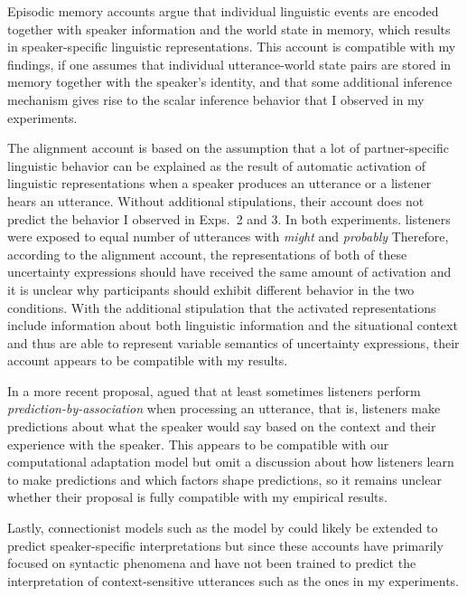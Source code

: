 Episodic memory accounts  argue that individual linguistic 
events are encoded together with speaker information and the world state in memory, 
which results in speaker-specific linguistic representations. This account is compatible with my findings, if one assumes
that individual utterance-world state pairs are stored in memory together with the speaker's 
identity, and that some additional inference mechanism gives rise to the scalar inference
 behavior that I observed in my experiments.

The alignment account  \cite{Pickering2004} is based on the assumption that a lot of partner-specific linguistic behavior
 can be explained as the result of automatic activation of linguistic representations when 
a speaker produces an utterance or a listener hears an utterance. Without additional stipulations,
their account does not predict the behavior I observed in Exps.~2 and 3. In both experiments.
listeners were exposed to equal number of utterances with \textit{might} and \textit{probably}
Therefore, according to the alignment account, the representations of both of these uncertainty expressions
should have received the same amount of activation and it is unclear why participants should
exhibit different behavior in the two conditions. With the additional stipulation that the activated representations 
include information about both linguistic information 
and the situational context and thus are able to represent variable semantics of uncertainty expressions,
their account appears to be compatible with my results.

In a more recent proposal, \textcite{Pickering2013} agued that
at least sometimes listeners perform \textit{prediction-by-association} when processing
an utterance, that is, listeners make predictions about what the speaker would say based on
the context and their experience with the speaker.  This appears to
be compatible with our computational adaptation model but \citeauthor{Pickering2013} omit a discussion
about how listeners learn to make predictions and which factors shape predictions,
so it remains unclear whether their proposal is fully compatible with my empirical results.

Lastly, connectionist models such as the model by \textcite{Chang2006} could likely 
be extended to predict speaker-specific interpretations but since these accounts have primarily
focused on syntactic phenomena and have not been trained to predict the interpretation
of context-sensitive utterances such as the ones in my experiments.

